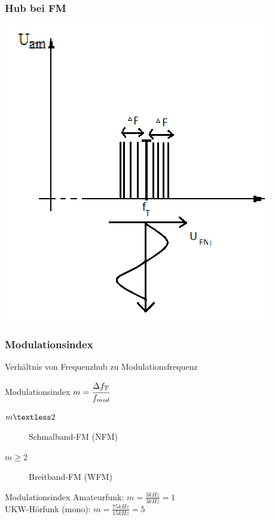 \begin{frame}
\frametitle{Hub bei FM}
\begin{center}
\includegraphics[scale=0.5]{e14/Hub.png}
\end{center}
\end{frame}

\begin{frame}
  \frametitle{Modulationsindex}
  Verhältnis von Frequenzhub zu Modulationsfrequenz
  \begin{block}{Modulationsindex}
    $m = \cfrac{\Delta f_T}{f_{mod}}$
  \end{block}
  \begin{description}
    \item[$m\textless2$] Schmalband-FM (NFM)
    \item[$m\geq$2] Breitband-FM (WFM)
  \end{description}
  \begin{exampleblock}{Modulationsindex}
    Amateurfunk: $m = \frac{3kHz}{3kHz} = 1$\\
    UKW-Hörfunk (mono): $m = \frac{75kHz}{15kHz} = 5$\\
  \end{exampleblock}
\end{frame}

